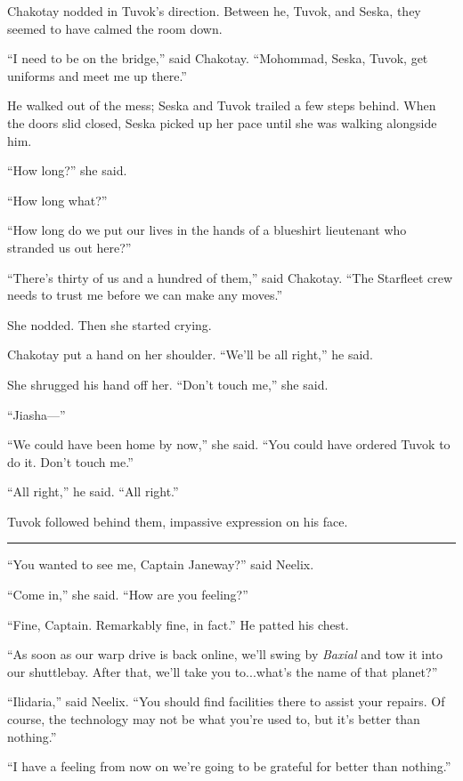 \documentclass[twoside,letterpaper,12pt]{memoir}
\begin{document}
Chakotay nodded in Tuvok’s direction. Between he, Tuvok, and Seska, they seemed to have calmed the room down. 

``I need to be on the bridge,” said Chakotay. ``Mohommad, Seska, Tuvok, get uniforms and meet me up there.” 

He walked out of the mess; Seska and Tuvok trailed a few steps behind. When the doors slid closed, Seska picked up her pace until she was walking alongside him. 

``How long?” she said. 

``How long what?” 

``How long do we put our lives in the hands of a blueshirt lieutenant who stranded us out here?” 

``There’s thirty of us and a hundred of them,” said Chakotay. ``The Starfleet crew needs to trust me before we can make any moves.” 

She nodded. Then she started crying. 

Chakotay put a hand on her shoulder. ``We’ll be all right,” he said. 

She shrugged his hand off her. ``Don’t touch me,” she said. 

``Jiasha---” 

``We could have been home by now,” she said. ``You could have ordered Tuvok to do it. Don’t touch me.” 

``All right,” he said. ``All right.” 

Tuvok followed behind them, impassive expression on his face. 

\begin{center}\rule{3cm}{0.4 pt}\end{center} 

``You wanted to see me, Captain Janeway?” said Neelix. 

``Come in,” she said. ``How are you feeling?” 

``Fine, Captain. Remarkably fine, in fact.” He patted his chest. 

``As soon as our warp drive is back online, we’ll swing by \textit{Baxial} and tow it into our shuttlebay. After that, we’ll take you to...what’s the name of that planet?” 

``Ilidaria,” said Neelix. ``You should find facilities there to assist your repairs. Of course, the technology may not be what you’re used to, but it’s better than nothing.” 

``I have a feeling from now on we’re going to be grateful for better than nothing.” 
\end{document}
